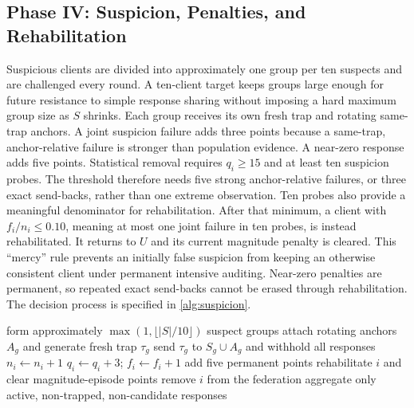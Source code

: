 \documentclass[conference]{IEEEtran}
\begin{document}
\subsection{Phase IV: Suspicion, Penalties, and Rehabilitation}
Suspicious clients are divided into approximately one group per ten suspects and are challenged every round. A ten-client target keeps groups large enough for future resistance to simple response sharing without imposing a hard maximum group size as $S$ shrinks. Each group receives its own fresh trap and rotating same-trap anchors. A joint suspicion failure adds three points because a same-trap, anchor-relative failure is stronger than population evidence. A near-zero response adds five points. Statistical removal requires $q_i\geq15$ and at least ten suspicion probes. The threshold therefore needs five strong anchor-relative failures, or three exact send-backs, rather than one extreme observation. Ten probes also provide a meaningful denominator for rehabilitation. After that minimum, a client with $f_i/n_i\leq0.10$, meaning at most one joint failure in ten probes, is instead rehabilitated. It returns to $U$ and its current magnitude penalty is cleared. This ``mercy'' rule prevents an initially false suspicion from keeping an otherwise consistent client under permanent intensive auditing. Near-zero penalties are permanent, so repeated exact send-backs cannot be erased through rehabilitation. The decision process is specified in \autoref{alg:suspicion}.

\begin{algorithm}[t]
\caption{Phase IV: weighted suspicion and decision}
\label{alg:suspicion}
\begin{algorithmic}[1]
\State form approximately $\max(1,\lfloor|S|/10\rfloor)$ suspect groups
 \State attach rotating anchors $A_g$ and generate fresh trap $\tau_g$
 \State send $\tau_g$ to $S_g\cup A_g$ and withhold all responses
   \State $n_i\gets n_i+1$
    \State $q_i\gets q_i+3$; $f_i\gets f_i+1$
   \EndIf
    \State add five permanent points
   \EndIf
     \State rehabilitate $i$ and clear magnitude-episode points
     \State remove $i$ from the federation
   \EndIf
 \EndFor
\EndFor
\State aggregate only active, non-trapped, non-candidate responses
\end{algorithmic}
\end{algorithm}
\end{document}
